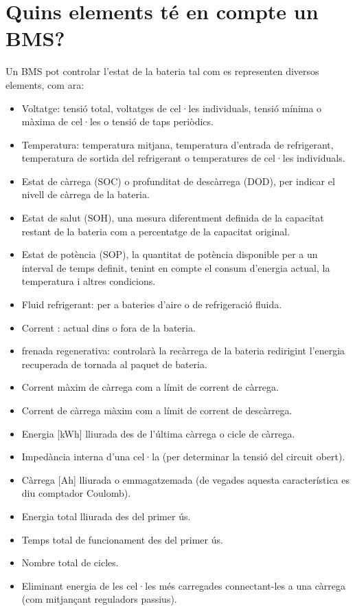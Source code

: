 \section{Quins elements té en compte un BMS?}
Un BMS pot controlar l'estat de la bateria tal com es representen diversos elements, com ara:
\begin{itemize}	
	\item Voltatge: tensió total, voltatges de cel·les individuals, tensió mínima o màxima de cel·les o tensió de taps periòdics.
    \item Temperatura: temperatura mitjana, temperatura d'entrada de refrigerant, temperatura de sortida del refrigerant o temperatures de cel·les individuals.
    \item Estat de càrrega (SOC) o profunditat de descàrrega (DOD), per indicar el nivell de càrrega de la bateria.
    \item Estat de salut (SOH), una mesura diferentment definida de la capacitat restant de la bateria com a percentatge de la capacitat original.
    \item Estat de potència (SOP), la quantitat de potència disponible per a un interval de temps definit, tenint en compte el consum d'energia actual, la temperatura i altres condicions.
    \item Fluid refrigerant: per a bateries d'aire o de refrigeració fluida.
    \item Corrent : actual dins o fora de la bateria. 
    \item frenada regenerativa: controlarà la recàrrega de la bateria redirigint l'energia recuperada de tornada al paquet de bateria.
    \item Corrent màxim de càrrega com a límit de corrent de càrrega.
    \item Corrent de càrrega màxim com a límit de corrent de descàrrega.
	\item Energia [kWh] lliurada des de l'última càrrega o cicle de càrrega.
	\item Impedància interna d'una cel·la (per determinar la tensió del circuit obert).
	\item Càrrega [Ah] lliurada o emmagatzemada (de vegades aquesta característica es diu comptador Coulomb).
	\item Energia total lliurada des del primer ús.
	\item Temps total de funcionament des del primer ús.
	\item Nombre total de cicles.
    \item Eliminant energia de les cel·les més carregades connectant-les a una càrrega (com mitjançant reguladors passius).
\end{itemize}

